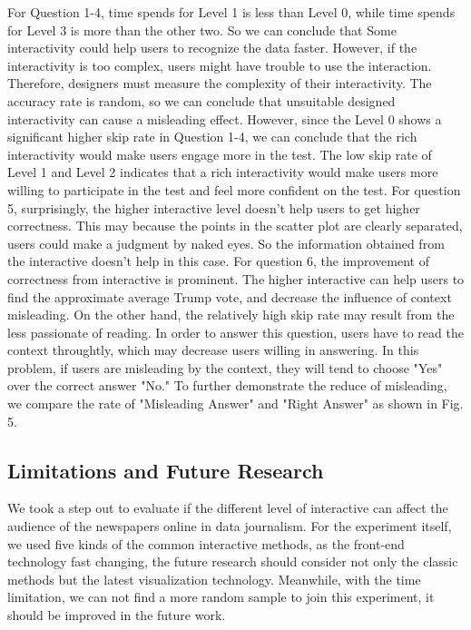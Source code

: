 \documentclass[9pt,journal,compsoc]{IEEEtran}
\begin{document}
For Question 1-4, time spends for Level 1 is less than Level 0, while time spends for Level 3 is more than the other two. So we can conclude that Some interactivity could help users to recognize the data faster. However, if the interactivity is too complex, users might have trouble to use the interaction. Therefore, designers must measure the complexity of their interactivity. The accuracy rate is random, so we can conclude that unsuitable designed interactivity can cause a misleading effect. However, since the Level 0 shows a significant higher skip rate in Question 1-4, we can conclude that the rich interactivity would make users engage more in the test. The low skip rate of Level 1 and Level 2 indicates that a rich interactivity would make users more willing to participate in the test and feel more confident on the test.
For question 5, surprisingly, the higher interactive level doesn't help users to get higher correctness. This may because the points in the scatter plot are clearly separated,  users could make a judgment by naked eyes. So the information obtained from the interactive doesn't help in this case. For question 6, the improvement of correctness from interactive is prominent. The higher interactive can help users to find the approximate average Trump vote, and decrease the influence of context misleading. On the other hand, the relatively high skip rate may result from the less passionate of reading. In order to answer this question, users have to read the context throughtly, which may decrease users willing in answering. In this problem, if users are misleading by the context, they will tend to choose "Yes" over the correct answer "No." To further demonstrate the reduce of misleading, we compare the rate of "Misleading Answer" and "Right Answer" as shown in Fig. 5.

\subsection{Limitations and Future Research}

We took a step out to evaluate if the different level of interactive can affect the audience of the newspapers online in data journalism. For the experiment itself, we used five kinds of the common interactive methods, as the front-end technology fast changing, the future research should consider not only the classic methods but the latest visualization technology. Meanwhile, with the time limitation, we can not find a more random sample to join this experiment, it should be improved in the future work.
\end{document}
